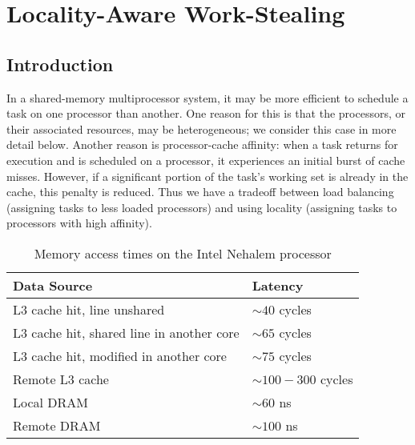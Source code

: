 
\part{Locality-Aware Work-Stealing}
\label{part:locality}

\chapter{Introduction}
\label{chap:locality-introduction}

In a shared-memory multiprocessor system, it may be more efficient to
schedule a task on one processor than another. One reason for this is
that the processors, or their associated resources, may be
heterogeneous; we consider this case in more detail below. Another
reason is processor-cache affinity: when a task returns for execution
and is scheduled on a processor, it experiences an initial burst of
cache misses. However, if a significant portion of the task's working
set is already in the cache, this penalty is reduced. Thus we have a
tradeoff between load balancing (assigning tasks to less loaded
processors) and using locality (assigning tasks to processors with
high affinity).

\begin{table}[htb]
  \centering
  \begin{tabular}{ll}
    \toprule
    Data Source & Latency \\\midrule
    L3 cache hit, line unshared & $\sim 40$ cycles\\
    L3 cache hit, shared line in another core\hspace{0.5cm} & $\sim 65$ cycles \\
    L3 cache hit, modified in another core & $\sim 75$ cycles \\
    Remote L3 cache & $\sim 100 - 300$ cycles \\
    Local DRAM & $\sim 60$ ns \\
    Remote DRAM & $\sim 100$ ns \\\bottomrule
  \end{tabular}
  \caption[Memory access times on the Intel Nehalem processor]
  {Memory access times on the Intel Nehalem processor}
  \label{tab:locality-introduction-memory-access-times}
\end{table}

